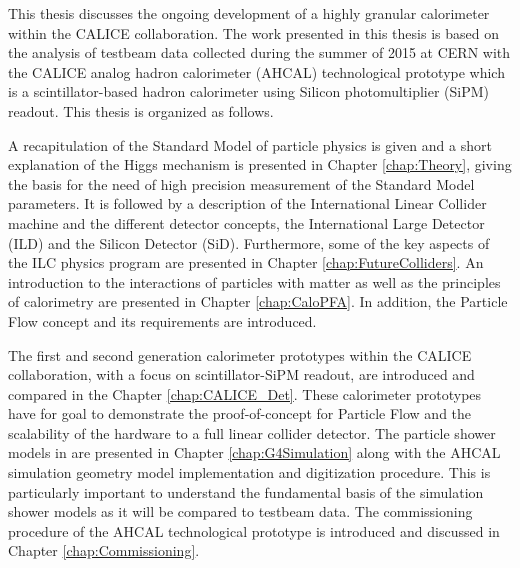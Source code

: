 This thesis discusses the ongoing development of a highly granular calorimeter within the CALICE collaboration. The work presented in this thesis is based on the analysis of testbeam data collected during the summer of 2015 at CERN with the CALICE analog hadron calorimeter (AHCAL) technological prototype which is a scintillator-based hadron calorimeter using Silicon photomultiplier (SiPM) readout. This thesis is organized as follows.

A recapitulation of the Standard Model of particle physics is given and a short explanation of the Higgs mechanism is presented in Chapter \ref{chap:Theory}, giving the basis for the need of high precision measurement of the Standard Model parameters. It is followed by a description of the International Linear Collider machine and the different detector concepts, the International Large Detector (ILD) and the Silicon Detector (SiD). Furthermore, some of the key aspects of the ILC physics program are presented in Chapter \ref{chap:FutureColliders}. An introduction to the interactions of particles with matter as well as the principles of calorimetry are presented in Chapter \ref{chap:CaloPFA}. In addition, the Particle Flow concept and its requirements are introduced.

The first and second generation calorimeter prototypes within the CALICE collaboration, with a focus on scintillator-SiPM readout, are introduced and compared in the Chapter \ref{chap:CALICE_Det}. These calorimeter prototypes have for goal to demonstrate the proof-of-concept for Particle Flow and the scalability of the hardware to a full linear collider detector. The particle shower models in \geant are presented in Chapter \ref{chap:G4Simulation} along with the AHCAL simulation geometry model implementation and digitization procedure. This is particularly important to understand the fundamental basis of the simulation shower models as it will be compared to testbeam data. The commissioning procedure of the AHCAL technological prototype is introduced and discussed in Chapter \ref{chap:Commissioning}.

